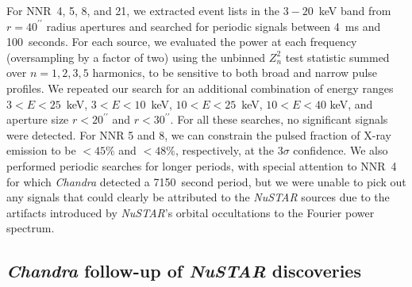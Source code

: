 \documentclass[iop,revtex4]{emulateapj}
\begin{document}
For NNR~4, 5, 8, and 21, we extracted event lists in the
$3-20$~keV band from $r=40^{\prime\prime}$ radius apertures and
searched for periodic signals between 4~ms and 100~seconds. For each
source, we evaluated the power at each frequency (oversampling by a
factor of two) using the unbinned $Z^2_n$ test statistic \citep{buccheri83} summed over $n =1,2,3,5$ harmonics, to be sensitive to both
broad and narrow pulse profiles.  We repeated our search for an
additional combination of energy ranges $3<E<25$~keV, $3<E<10$~keV,
$10<E<25$~keV, $10<E<40$ keV, and aperture size $r< 20^{\prime\prime}$
and $r< 30^{\prime\prime}$. For all these searches, no significant
signals were detected. For NNR 5 and 8, we can constrain the pulsed
fraction of X-ray emission to be $< 45\%$ and $< 48\%$, respectively,
at the $3\sigma$ confidence.  We also performed periodic searches for
longer periods, with special attention to NNR~4 for which \textit{Chandra}
detected a 7150~second period, but we were unable to pick out any
signals that could clearly be attributed to the \textit{NuSTAR} sources due to
the artifacts introduced by \textit{NuSTAR}'s orbital occultations to the
Fourier power spectrum.

\subsection{\textit{Chandra} follow-up of \textit{NuSTAR} discoveries}
\label{sec:chandrafollowup}
\end{document}
